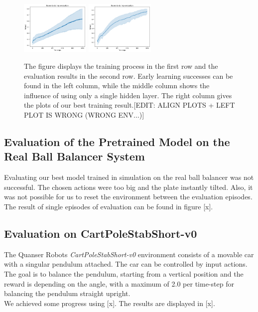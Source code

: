 \begin{figure}[H]
	\includegraphics[width=0.295\textwidth]{plots/DDPGballbalancer24-2-16.png}
	\includegraphics[width=0.295\textwidth]{plots/DDPGballbalancer26-2-20.png}

	\caption{The figure displays the training process in the first row and the evaluation results in the second row. Early learning successes can be found in the left column, while the middle column shows the influence of using only a single hidden layer. The right column gives the plots of our best training result.[EDIT: ALIGN PLOTS + LEFT PLOT IS WRONG (WRONG ENV...)]}
	\label{ddpg:ball}
\end{figure}
\subsection{Evaluation of the Pretrained Model on the Real Ball Balancer System}
Evaluating our best model trained in simulation on the real ball balancer was not successful. The chosen actions were too big and the plate instantly tilted. Also, it was not possible for us to reset the environment between the evaluation episodes. The result of single episodes of evaluation can be found in figure [x].
\subsection{Evaluation on CartPoleStabShort-v0}
The Quanser Robots \textit{CartPoleStabShort-v0} environment consists of a movable car with a singular pendulum attached. The car can be controlled by input actions. The goal is to balance the pendulum, starting from a vertical position and the reward is depending on the angle, with a maximum of 2.0 per time-step for balancing the pendulum straight upright.\\
We achieved some progress using [x]. The results are displayed in [x].
